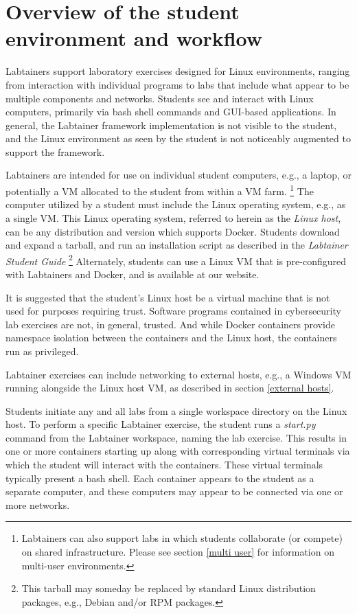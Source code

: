 \documentclass[12pt]{article}
\begin{document}
\section {Overview of the student environment and workflow}
Labtainers support laboratory exercises designed for Linux environments,
ranging from interaction with individual programs to labs that include
what appear to be multiple components and networks.  Students see and interact with Linux
computers, primarily via bash shell commands and GUI-based applications. In general, the Labtainer
framework implementation is not visible to the student, and the Linux
environment as seen by the student is not noticeably augmented to support the framework.

Labtainers are intended for use on individual student computers, e.g., a laptop,
or potentially a VM allocated to the student from within a VM farm. \footnote{Labtainers
can also support labs in which students collaborate (or compete) on shared infrastructure.
Please see section \ref{multi user} for information on multi-user environments.}
The computer utilized by a student must include the Linux operating system, e.g.,
as a single VM.  This Linux operating system, referred to herein
as the \textit{Linux host}, can be any distribution and version
which supports Docker.  Students download and expand a tarball, and run
an installation script as described in the \textit{Labtainer Student Guide}
\footnote{This tarball may someday be replaced by standard Linux distribution packages,
e.g., Debian and/or RPM packages.} Alternately, students can use a Linux VM
that is pre-configured with Labtainers and Docker, and is available at our website.

It is suggested that the student's Linux host be a virtual machine that is
not used for purposes requiring trust.  Software programs contained in cybersecurity lab
exercises are not, in general, trusted.  And while Docker containers provide namespace
isolation between the containers and the Linux host, the containers run as privileged.

Labtainer exercises can include networking to external hosts, e.g., a Windows VM
running alongside the Linux host VM, as described in section \ref{external hosts}.

Students initiate any and all labs from a
single workspace directory on the Linux host.
To perform a specific Labtainer exercise, the student runs a \textit{start.py} command from
the Labtainer workspace, naming the lab exercise.  This results in one or more
containers starting up along with corresponding virtual terminals via which the 
student will interact with the containers.  These virtual terminals typically
present a bash shell.  Each container appears to the student as a separate
computer, and these computers may appear to be connected via one or more networks.  
\end{document}
